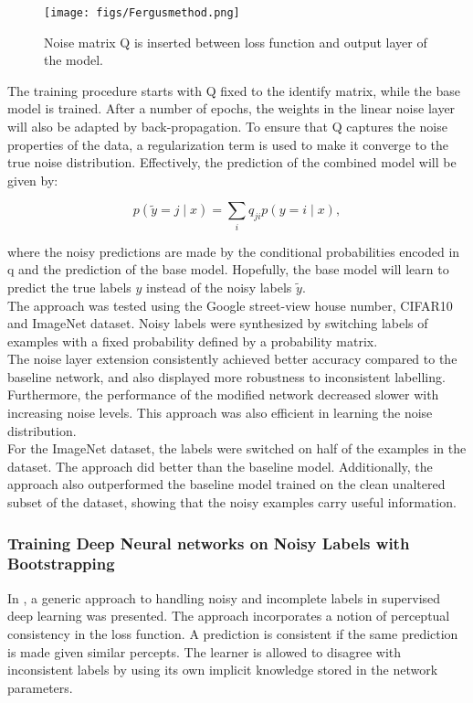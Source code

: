 \begin{figure}
\begin{center}
\texttt{[image: figs/Fergusmethod.png]}
\caption[Noise matrix Q]{Noise matrix Q is inserted between loss function and output layer of the model.}
\label{fig:fergus_method}
\end{center}
\end{figure}

The training procedure starts with Q fixed to the identify matrix, while the base model is trained. After a number of epochs, the weights in the linear noise layer will also be adapted by back-propagation. To ensure that Q captures the noise properties of the data, a regularization term is used to make it converge to the true noise distribution. Effectively, the prediction of the combined model will be given by:

$$p(\tilde{y} = j \mid x) = \sum_{i} q_{ji}p(y = i \mid x),$$ 

where the noisy predictions are made by the conditional probabilities encoded in q and the prediction of the base model. Hopefully, the base model will learn to predict the true labels $y$ instead of the noisy labels $\tilde{y}$.  \\

The approach was tested using the Google street-view house number, CIFAR10 and ImageNet dataset. Noisy labels were synthesized by switching labels of examples with a fixed probability defined by a probability matrix. \\

The noise layer extension consistently achieved better accuracy compared to the baseline network, and also displayed more robustness to inconsistent labelling. Furthermore, the performance of the modified network decreased slower with increasing noise levels. This approach was also efficient in learning the noise distribution. \\

For the ImageNet dataset, the labels were switched on half of the examples in the dataset. The approach did better than the baseline model. Additionally, the approach also outperformed the baseline model trained on the clean unaltered subset of the dataset, showing that the noisy examples carry useful information.


\subsubsection{Training Deep Neural networks on Noisy Labels with Bootstrapping}
In \cite{Reed_noisy_labels_bootstrapping}, a generic approach to handling noisy and incomplete labels in supervised deep learning was presented. The approach incorporates a notion of perceptual consistency in the loss function. A prediction is consistent if the same prediction is made given similar percepts. The learner is allowed to disagree with inconsistent labels by using its own implicit knowledge stored in the network parameters.\\ 

